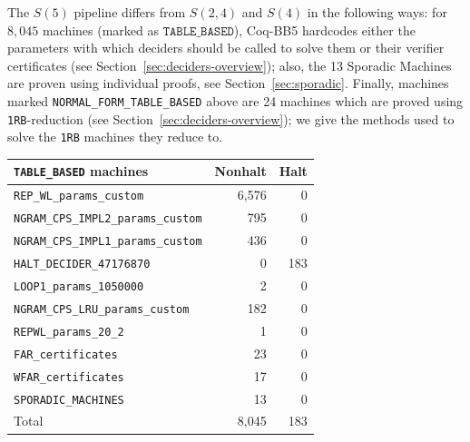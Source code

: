 \documentclass[letterpaper,british,11pt]{article}
\theoremstyle{definition} %
\numberwithin{equation}{section}
\theoremstyle{definition} %
\newcommand{\CoqBB}{Coq-BB5\xspace}
\begin{document}
The $S(5)$ pipeline differs from $S(2,4)$ and $S(4)$ in the following ways: for $8{,}045$ machines (marked as $\texttt{TABLE\_BASED}$), \CoqBB hardcodes either the parameters with which deciders should be called to solve them or their verifier certificates (see Section~\ref{sec:deciders-overview}); also, the 13 Sporadic Machines are proven using individual \Coq proofs, see Section~\ref{sec:sporadic}. Finally, machines marked \texttt{NORMAL\_FORM\_TABLE\_BASED} above are 24 machines which are proved using \texttt{1RB}-reduction (see Section~\ref{sec:deciders-overview}); we give the methods used to solve the \texttt{1RB} machines they reduce to.
\begin{table}[H]
    \centering
    \begin{minipage}{0.55\linewidth}
        \centering
        \begin{tabular}{|lrr|}
            \hline
            \texttt{TABLE\_BASED} machines             & Nonhalt & Halt \\
            \hline
            \texttt{REP\_WL\_params\_custom}           & 6{,}576 & 0    \\
            \texttt{NGRAM\_CPS\_IMPL2\_params\_custom} & 795     & 0    \\
            \texttt{NGRAM\_CPS\_IMPL1\_params\_custom} & 436     & 0    \\
            \texttt{HALT\_DECIDER\_47176870}           & 0       & 183  \\
            \texttt{LOOP1\_params\_1050000}            & 2       & 0    \\
            \texttt{NGRAM\_CPS\_LRU\_params\_custom}   & 182     & 0    \\
            \texttt{REPWL\_params\_20\_2}              & 1       & 0    \\
            \texttt{FAR\_certificates}                 & 23      & 0    \\
            \texttt{WFAR\_certificates}                & 17      & 0    \\
            \texttt{SPORADIC\_MACHINES}                & 13      & 0    \\
            \hline
            Total                                      & 8{,}045 & 183  \\
            \hline
        \end{tabular}
    \end{minipage}%
    \hfill
    \begin{minipage}{0.35\linewidth}
        \centering
        \begin{tabular}{|lr|}

\end{tabular}
\end{minipage}
\end{table}
\end{document}
